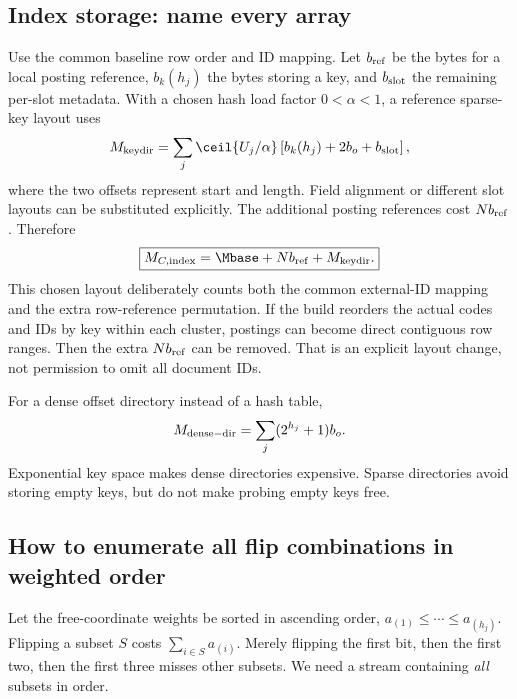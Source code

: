 \subsection{Index storage: name every array}
Use the common baseline row order and ID mapping. Let $b_{\rm ref}$ be the bytes for a local
posting reference, $b_k(h_j)$ the bytes storing a key, and $b_{\rm slot}$ the remaining per-slot
metadata. With a chosen hash load factor $0<\alpha<1$, a reference sparse-key layout uses
\begin{equation}
M_{\rm keydir}=\sum_j\ceil{U_j/\alpha}
                 \left[b_k(h_j)+2b_o+b_{\rm slot}\right],
\label{eq:hash-storage}
\end{equation}
where the two offsets represent start and length. Field alignment or different slot layouts
can be substituted explicitly. The additional posting references cost $N b_{\rm ref}$.
Therefore
\begin{equation}
\boxed{M_{C,\rm index}=\Mbase+N b_{\rm ref}+M_{\rm keydir}.}
\label{eq:keys-storage}
\end{equation}
This chosen layout deliberately counts both the common external-ID mapping and the extra
row-reference permutation. If the build reorders the actual codes and IDs by key within each
cluster, postings can become direct contiguous row ranges. Then the extra $N b_{\rm ref}$ can
be removed. That is an explicit layout change, not permission to omit all document IDs.

For a dense offset directory instead of a hash table,
\[
M_{\rm dense-dir}=\sum_j(2^{h_j}+1)b_o.
\]
Exponential key space makes dense directories expensive. Sparse directories avoid storing
empty keys, but do not make probing empty keys free.

\subsection{How to enumerate all flip combinations in weighted order}
Let the free-coordinate weights be sorted in ascending order,
$a_{(1)}\leq\cdots\leq a_{(h_j)}$. Flipping a subset $S$ costs
$\sum_{i\in S}a_{(i)}$. Merely flipping the first bit, then the first two, then the first three
misses other subsets. We need a stream containing \emph{all} subsets in order.

